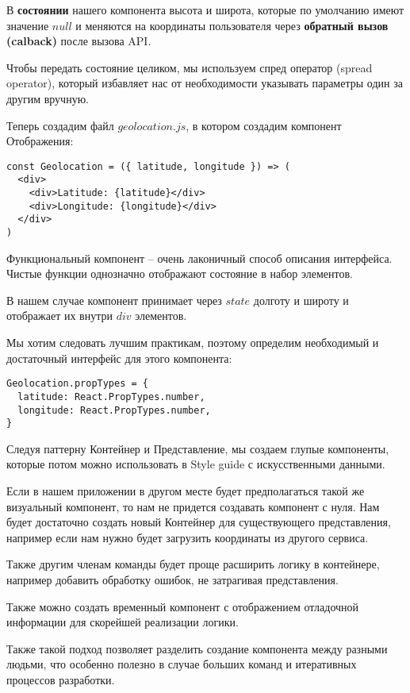 В \textbf{состоянии} нашего компонента высота и широта, которые по умолчанию имеют значение $null$ и меняются на координаты пользователя через \textbf{обратный вызов (calback)} после вызова API.

Чтобы передать состояние целиком, мы используем спред оператор (spread operator), который избавляет нас от необходимости указывать параметры один за другим вручную.

Теперь создадим файл $geolocation.js$, в котором создадим компонент Отображения:

\begin{lstlisting}
const Geolocation = ({ latitude, longitude }) => (
  <div>
    <div>Latitude: {latitude}</div>
    <div>Longitude: {longitude}</div>
  </div>
)
\end{lstlisting}

Функциональный компонент -- очень лаконичный способ описания интерфейса. Чистые функции однозначно отображают состояние в набор элементов.

В нашем случае компонент принимает через $state$ долготу и широту и отображает их внутри $div$ элементов.

Мы хотим следовать лучшим практикам, поэтому определим необходимый и достаточный интерфейс для этого компонента:

\begin{lstlisting}
Geolocation.propTypes = {
  latitude: React.PropTypes.number,
  longitude: React.PropTypes.number,
}	
\end{lstlisting}

Следуя паттерну Контейнер и Представление, мы создаем глупые компоненты, которые потом можно использовать в Style guide с искусственными данными.

Если в нашем приложении в другом месте будет предполагаться такой же визуальный компонент, то нам не придется создавать компонент с нуля. Нам будет достаточно создать новый Контейнер для существующего представления, например если нам нужно будет загрузить координаты из другого сервиса.

Также другим членам команды будет проще расширить логику в контейнере, например добавить обработку ошибок, не затрагивая представления.

Также можно создать временный компонент с отображением отладочной информации для скорейшей реализации логики.

Также такой подход позволяет разделить создание компонента между разными людьми, что особенно полезно в случае больших команд и итеративных процессов разработки.

